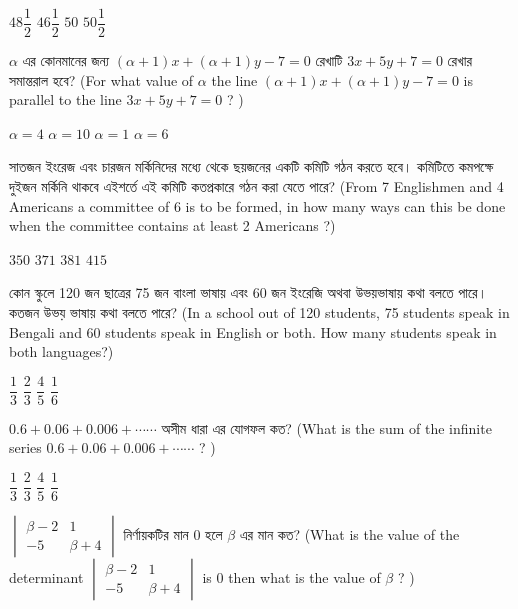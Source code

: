 \documentclass[addpoints]{exam}
\begin{document}
\begin{questions}
\begin{oneparchoices}
\choice $ 48\dfrac{1}{2} $
\choice $ 46\dfrac{1}{2} $
\choice $ 50 $
\choice  $ 50\dfrac{1}{2} $
\end{oneparchoices}

\question $ \alpha $ এর কোনমানের জন্য $ (\alpha+1)x+(\alpha +1)y-7=0 $ রেখাটি $ 3x+5y+7=0 $ রেখার সমান্তরাল হবে? (For what value of $ \alpha $ the line $ (\alpha+1)x+(\alpha +1)y-7=0 $ is parallel to the line $ 3x+5y+7=0 $ ? )

\begin{oneparchoices}
\choice $ \alpha = 4 $
\choice $ \alpha = 10 $
\choice $ \alpha = 1 $
\choice $ \alpha = 6 $  
\end{oneparchoices}

\question সাতজন ইংরেজ এবং চারজন মর্কিনিদের মধ্যে থেকে ছয়জনের একটি কমিটি গঠন করতে হবে। কমিটিতে কমপক্ষে দুইজন মর্কিনি থাকবে এইশর্তে এই কমিটি কতপ্রকারে গঠন করা যেতে পারে? (From 7 Englishmen and 4 Americans a committee of 6 is to be formed, in how many ways can this be done when the committee contains at least 2 Americans ?)

\begin{oneparchoices}
\choice $ 350 $
\choice $ 371 $
\choice $ 381 $
\choice $ 415 $
\end{oneparchoices}

\question কোন স্কুলে 120 জন ছাত্রের 75 জন বাংলা ভাষায় এবং 60 জন ইংরেজি অথবা উভয়ভাষায় কথা বলতে পারে। কতজন উভয় ভাষায় কথা বলতে পারে? (In a school out of 120 students, 75 students speak in Bengali and 60 students speak in English or both. How many students speak in both languages?)

\begin{oneparchoices}
\choice $ \dfrac{1}{3} $
\choice $ \dfrac{2}{3} $
\choice $ \dfrac{4}{5} $
\choice $ \dfrac{1}{6} $
\end{oneparchoices}

\question $ 0.6+0.06+0.006+ \cdots \cdots $ অসীম ধারা এর যোগফল কত? (What is the sum of the infinite series $ 0.6+0.06+0.006+ \cdots \cdots $ ? )


\begin{oneparchoices}
\choice $ \dfrac{1}{3} $
\choice $ \dfrac{2}{3} $
\choice $ \dfrac{4}{5} $
\choice $ \dfrac{1}{6} $
\end{oneparchoices}

\question $ \begin{vmatrix}
\beta -2 & 1\\
-5 & \beta +4
\end{vmatrix} $ নির্ণায়কটির মান $ 0 $ হলে $ \beta $ এর মান কত? (What is the value of the determinant $ \begin{vmatrix}
\beta -2 & 1\\
-5 & \beta +4
\end{vmatrix} $ is 0 then what is the value of $ \beta $ ? )



\end{questions}
\end{document}
